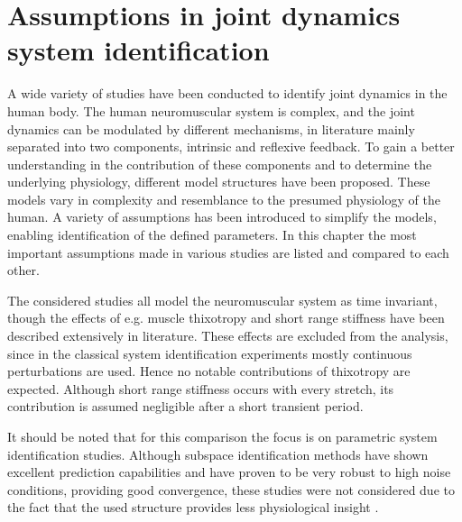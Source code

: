 


\chapter{Assumptions in joint dynamics system identification}
\label{chap:assumptions}
A wide variety of studies have been conducted to identify joint dynamics in the human body. The human neuromuscular system is complex, and the joint dynamics can be modulated by different mechanisms, in literature mainly separated into two components, intrinsic and reflexive feedback. To gain a better understanding in the contribution of these components and to determine the underlying physiology, different model structures have been proposed. These models vary in complexity and resemblance to the presumed physiology of the human. A variety of assumptions has been introduced to simplify the models, enabling identification of the defined parameters. In this chapter the most important assumptions made in various studies are listed and compared to each other.

The considered studies all model the neuromuscular system as time invariant, though the effects of e.g. muscle thixotropy and short range stiffness have been described extensively in literature. These effects are excluded from the analysis, since in the classical system identification experiments mostly continuous perturbations are used. Hence no notable contributions of thixotropy are expected. Although short range stiffness occurs with every stretch, its contribution is assumed negligible after a short transient period.

It should be noted that for this comparison the focus is on parametric system identification studies. Although subspace identification methods have shown excellent prediction capabilities and have proven to be very robust to high noise conditions, providing good convergence, these studies were not considered due to the fact that the used structure provides less physiological insight \cite{jalaleddini_subspace_2017}. 

